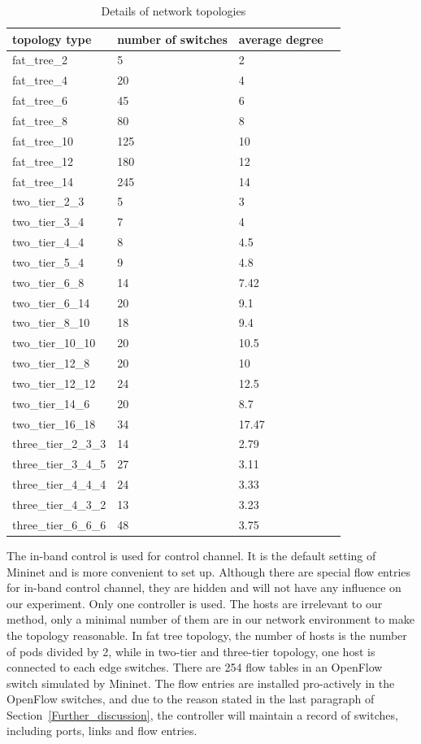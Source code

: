 \begin{table}[H]
\centering
\caption{Details of network topologies}
\begin{tabular}{|l||l|l|l|}
\hline topology type & number of switches & average degree \\
\hline
\hline fat\_tree\_2 & 5 & 2 \\
\hline fat\_tree\_4 & 20 & 4 \\
\hline fat\_tree\_6 & 45 & 6 \\
\hline fat\_tree\_8 & 80 & 8 \\
\hline fat\_tree\_10 & 125 & 10 \\
\hline fat\_tree\_12 & 180 & 12 \\
\hline fat\_tree\_14 & 245 & 14 \\
\hline two\_tier\_2\_3 & 5 & 3 \\
\hline two\_tier\_3\_4 & 7 & 4 \\
\hline two\_tier\_4\_4 & 8 & 4.5 \\
\hline two\_tier\_5\_4 & 9 & 4.8 \\
\hline two\_tier\_6\_8 & 14 & 7.42 \\
\hline two\_tier\_6\_14 & 20 & 9.1 \\
\hline two\_tier\_8\_10 & 18 & 9.4 \\
\hline two\_tier\_10\_10 & 20 & 10.5 \\
\hline two\_tier\_12\_8 & 20 & 10 \\
\hline two\_tier\_12\_12 & 24 & 12.5 \\
\hline two\_tier\_14\_6 & 20 & 8.7 \\
\hline two\_tier\_16\_18 & 34 & 17.47 \\
\hline 
\hline three\_tier\_2\_3\_3 & 14 & 2.79 \\
\hline three\_tier\_3\_4\_5 & 27 & 3.11 \\
\hline three\_tier\_4\_4\_4 & 24 & 3.33 \\
\hline three\_tier\_4\_3\_2 & 13 & 3.23 \\
\hline three\_tier\_6\_6\_6 & 48 & 3.75 \\
\hline 
\end{tabular}
\label{table:network_env}
\end{table}

The in-band control is used for control channel. It is the default setting of Mininet and is more convenient to set up. Although there are special flow entries for in-band control channel, they are hidden and will not have any influence on our experiment. Only one controller is used. The hosts are irrelevant to our method, only a minimal number of them are in our network environment to make the topology reasonable. In fat tree topology, the number of hosts is the number of pods divided by 2, while in two-tier and three-tier topology, one host is connected to each edge switches. There are 254 flow tables in an OpenFlow switch simulated by Mininet. The flow entries are installed pro-actively in the OpenFlow switches, and due to the reason stated in the last paragraph of Section~\ref{Further_discussion}, the controller will maintain a record of switches, including ports, links and flow entries. 

